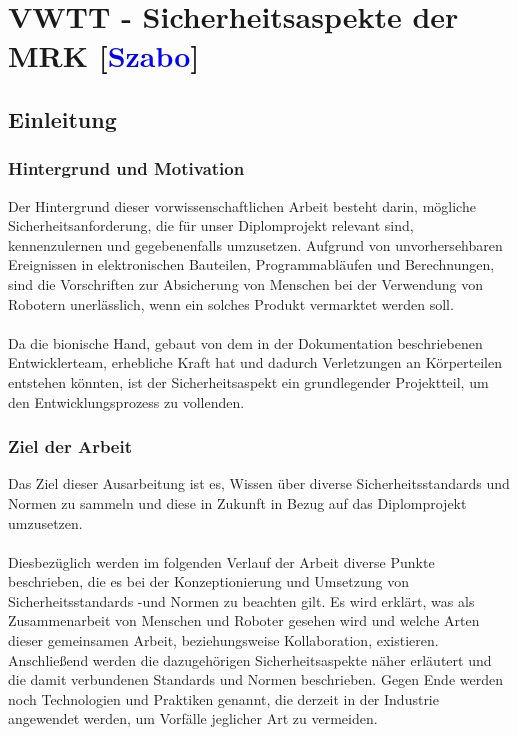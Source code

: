 \documentclass[titlepage,12pt,twoside]{article}
\begin{document}
\newpage

\section{VWTT - Sicherheitsaspekte der MRK [\textcolor{blue}{Szabo}]}
\subsection{Einleitung}
\subsubsection{Hintergrund und Motivation}
Der Hintergrund dieser vorwissenschaftlichen Arbeit besteht darin, mögliche 
Sicherheitsanforderung, die für unser Diplomprojekt relevant sind, kennenzulernen 
und gegebenenfalls umzusetzen. Aufgrund von unvorhersehbaren Ereignissen in 
elektronischen Bauteilen, Programmabläufen und Berechnungen, sind die Vorschriften 
zur Absicherung von Menschen bei der Verwendung von Robotern unerlässlich, wenn 
ein solches Produkt vermarktet werden soll. \\
\\
Da die bionische Hand, gebaut von dem in der Dokumentation beschriebenen 
Entwicklerteam, erhebliche Kraft hat und dadurch Verletzungen an Körperteilen 
entstehen könnten, ist der Sicherheitsaspekt ein grundlegender Projektteil, um 
den Entwicklungsprozess zu vollenden. \\
\subsubsection{Ziel der Arbeit}
Das Ziel dieser Ausarbeitung ist es, Wissen über diverse Sicherheitsstandards und 
Normen zu sammeln und diese in Zukunft in Bezug auf das Diplomprojekt umzusetzen. \\
\\ 
Diesbezüglich werden im folgenden Verlauf der Arbeit diverse Punkte beschrieben, 
die es bei der Konzeptionierung und Umsetzung von Sicherheitsstandards -und Normen 
zu beachten gilt. Es wird erklärt, was als Zusammenarbeit von Menschen und Roboter 
gesehen wird und welche Arten dieser gemeinsamen Arbeit, beziehungsweise 
Kollaboration, existieren. Anschließend werden die dazugehörigen 
Sicherheitsaspekte näher erläutert und die damit verbundenen Standards und Normen 
beschrieben. Gegen Ende werden noch Technologien und Praktiken genannt, die 
derzeit in der Industrie angewendet werden, um Vorfälle jeglicher Art zu vermeiden. \\
\end{document}
